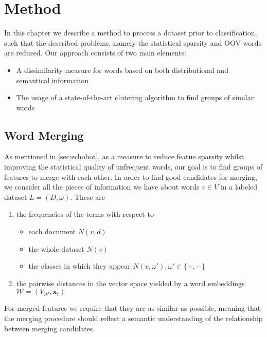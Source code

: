 \chapter{Method}

In this chapter we describe a method to process a dataset prior to
classification, such that the described problems, namely the statistical
sparsity and OOV-words are reduced. Our approach consists of two main
elements:

\begin{itemize}  
  \item A dissimilarity measure for words based on both distributional and
  semantical information
  \item The usage of a state-of-the-art clutering algorithm to find groups of
  similar words

\end{itemize}

\section{Word Merging}

As mentioned in \ref{sec:echobot}, as a measure to reduce featue sparsity
whilst improving the statistical quality of unfrequent words, our goal
is to find groups of features to merge with each other. 
In order to find good candidates for merging, we consider all the pieces of
information we have about words $v \in V$ in a labeled dataset $L=(D,\omega)$. These are

\begin{enumerate}
  \item the frequencies of the terms with respect to 
  \begin{itemize}
    \item each document  $N(v,d)$
  	\item the whole dataset $N(v)$
  	\item the classes in which they appear $N(v,\omega'), \omega' \in
  	\{+,-\}$
  \end{itemize}  
  \item the pairwise distances in the vector space yielded by a word embeddings
  $\mathcal{W}=(V_{\mathcal{W}}, \mathbf{x}_i)$
\end{enumerate}  

For merged features we require that they are as similar as possible, meaning
that the merging procedure should reflect a semantic understanding of the
relationship between merging candidates.
 

